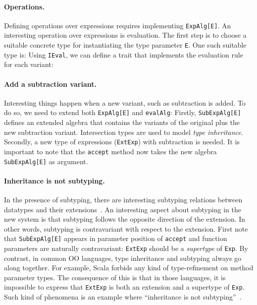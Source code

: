 \paragraph{Operations.} Defining operations over expressions requires
implementing \lstinline{ExpAlg[E]}. An interesting operation over expressions is
evaluation. The first step is to choose a suitable concrete type for
instantiating the type parameter \lstinline{E}. One such suitable type is:
Using \lstinline{IEval}, we can define a trait that implements the evaluation
rule for each variant:


\paragraph{Add a subtraction variant.} Interesting things happen when a new
variant, such as subtraction is added. To do so, we need to extend both
\lstinline{ExpAlg[E]} and \lstinline{evalAlg}:
Firstly, \lstinline{SubExpAlg[E]} defines an extended algebra that contains the
variants of the original plus the new subtraction variant. Intersection types
are used to model \textit{type inheritance}. Secondly, a new type of expressions
(\lstinline{ExtExp}) with subtraction is needed. It is important to note that
the \lstinline{accept} method now takes the new algebra \lstinline{SubExpAlg[E]}
as argument.

\paragraph{Inheritance is not subtyping.} In the presence of subtyping, there
are interesting subtyping relations between datatypes and their
extensions~\cite{oliveira09modular}. An interesting aspect about subtyping in
the new system is that subtyping follows the opposite direction of the
extension. In other words, subtyping is contravariant with respect to the
extension. First note that \lstinline{SubExpAlg[E]} appears in parameter
position of \lstinline{accept} and function parameters are naturally
contravariant: \lstinline{ExtExp} should be a \textit{supertype} of
\lstinline{Exp}. By contrast, in common OO languages, type inheritance and
subtyping always go along together. For example, Scala forbids any kind of
type-refinement on method parameter types. The consequence of this is that in
those languages, it is impossible to express that \lstinline{ExtExp} is both an
extension and a supertype of \lstinline{Exp}. Such kind of phenomena is an
example where ``inheritance is not subtyping''~\cite{cook1989inheritance}.

